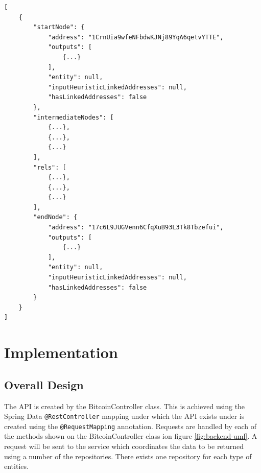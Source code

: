 \begin{lstlisting}[label={lst:path-find-response}, caption={Response to a path find query}, breaklines=true, basicstyle=\small]
[
    {
        "startNode": {
            "address": "1CrnUia9wfeNFbdwKJNj89YqA6qetvYTTE",
            "outputs": [
                {...}
            ],
            "entity": null,
            "inputHeuristicLinkedAddresses": null,
            "hasLinkedAddresses": false
        },
        "intermediateNodes": [
            {...},
            {...},
            {...}
        ],
        "rels": [
            {...},
            {...},
            {...}
        ],
        "endNode": {
            "address": "17c6L9JUGVenn6CfqXuB93L3Tk8Tbzefui",
            "outputs": [
                {...}
            ],
            "entity": null,
            "inputHeuristicLinkedAddresses": null,
            "hasLinkedAddresses": false
        }
    }
]
\end{lstlisting}

\section{Implementation} 
\subsection{Overall Design}
The API is created by the BitcoinController class. This is achieved using the Spring Data \texttt{@RestController} mapping under which the API exists under is created using the \texttt{@RequestMapping} annotation. Requests are handled by each of the methods shown on the BitcoinController class ion figure \ref{fig:backend-uml}. A request will be sent to the service which coordinates the data to be returned using a number of the repositories. There exists one repository for each type of entities. 

